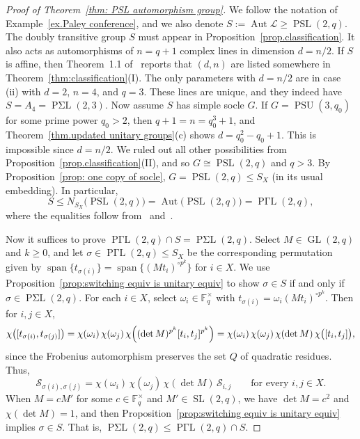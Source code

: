 \begin{proof}[Proof of Theorem~\ref{thm: PSL automorphism group}]
We follow the notation of Example~\ref{ex.Paley conference}, and we also denote $S:= \operatorname{Aut} \mathscr{L} \geq \operatorname{PSL}(2,q)$.
The doubly transitive group $S$ must appear in Proposition~\ref{prop.classification}.
It also acts as automorphisms of $n = q+1$ complex lines in dimension $d = n/2$.
If $S$ is affine, then Theorem~1.1 of~\cite{DempwolffK:23} reports that $(d,n)$ are listed somewhere in Theorem~\ref{thm:classification}(I).
The only parameters with $d=n/2$ are in case (ii) with $d=2$, $n=4$, and $q=3$.
These lines are unique, and they indeed have $S = A_4 = \operatorname{P\text{$\Sigma$}L}(2,3)$.
Now assume $S$ has simple socle $G$.
If $G = \operatorname{PSU}(3,q_0)$ for some prime power $q_0 > 2$, then $q+1 = n = q_0^3 + 1$, and Theorem~\ref{thm.updated unitary groups}(c) shows $d = q_0^2 - q_0 + 1$.
This is impossible since $d = n/2$.
We ruled out all other possibilities from Proposition~\ref{prop.classification}(II), and so $G \cong \operatorname{PSL}(2,q)$ and $q > 3$.
By Proposition~\ref{prop: one copy of socle}, $G = \operatorname{PSL}(2,q) \leq S_X$ (in its usual embedding).
In particular,
\[
S \leq N_{S_X}\bigl( \operatorname{PSL}(2,q) \bigr) = \operatorname{Aut}\bigl( \operatorname{PSL}(2,q) \bigr) = \operatorname{P\text{$\Gamma$}L}(2,q),
\]
where the equalities follow from~\cite[Theorem~4.2A]{DixonMortimer:96} and~\cite[\S 3.3.4]{Wilson:09}.


Now it suffices to prove $\operatorname{P\text{$\Gamma$}L}(2,q) \cap S = \operatorname{P\text{$\Sigma$}L}(2,q)$.
Select $M \in \operatorname{GL}(2,q)$ and $k \geq 0$, and let $\sigma \in \operatorname{P\text{$\Gamma$}L}(2,q) \leq S_X$ be the corresponding permutation given by $\operatorname{span}\{ t_{\sigma(i)} \} = \operatorname{span}\{ (M t_i)^{\circ p^k} \}$ for $i \in X$.
We use Proposition~\ref{prop:switching equiv is unitary equiv} to show $\sigma \in S$ if and only if $\sigma \in \operatorname{P\text{$\Sigma$}L}(2,q)$.
For each $i \in X$, select $\omega_i \in \mathbb{F}_q^\times$ with $t_{\sigma(i)} = \omega_i (M t_i)^{\circ p^k}$.
Then for $i, j \in X$,
\[
\chi\bigl( [t_{\sigma(i)}, t_{\sigma(j)} ] \bigr) 
= \chi(\omega_i) \, \chi(\omega_j) \, \chi\Bigl( (\det M)^{p^k} [t_i, t_j]^{p^k} \Bigr)
= \chi(\omega_i) \, \chi(\omega_j) \, \chi( \det M) \, \chi\bigl( [t_i, t_j] \bigr),
\]
since the Frobenius automorphism preserves the set $Q$ of quadratic residues.
Thus,
\begin{equation}
\label{eq: PSL auto 1}
\mathcal{S}_{\sigma(i),\sigma(j)} = \chi(\omega_i) \, \chi(\omega_j) \, \chi( \det M) \, \mathcal{S}_{i,j}
\qquad
\text{for every $i,j \in X$.}
\end{equation}
When $M = c M'$ for some $c \in \mathbb{F}_q^\times$ and $M' \in \operatorname{SL}(2,q)$, we have $\det M = c^2$ and $\chi( \det M) = 1$, and then Proposition~\ref{prop:switching equiv is unitary equiv} implies $\sigma \in S$.
That is, $\operatorname{P\text{$\Sigma$}L}(2,q) \leq \operatorname{P\text{$\Gamma$}L}(2,q) \cap S$.


\end{proof}

